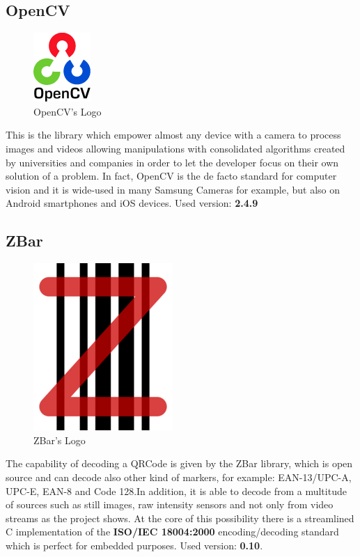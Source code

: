 \subsection{OpenCV}
\begin{figure}[hbt]
    \centering
    \caption{OpenCV's Logo}
    \includegraphics{img/opencv.png}
\end{figure}
This is the library which empower almost any device with a camera to process images and videos allowing manipulations with consolidated algorithms created by universities and companies in order to let the developer focus on their own solution of a problem. In fact, OpenCV is the de facto standard for computer vision and it is wide-used in many Samsung Cameras for example, but also on Android smartphones and iOS devices. 
\newline Used version: \textbf{2.4.9}

\subsection{ZBar}
\begin{figure}[hbt]
    \centering
    \caption{ZBar's Logo}
    \includegraphics{img/zbar.png}
\end{figure}
The capability of decoding a QRCode is given by the ZBar library, which is open source and can decode also other kind of markers, for example: EAN-13/UPC-A, UPC-E, EAN-8 and Code 128.In addition, it is able to decode from a multitude of sources such as still images, raw intensity sensors and not only from video streams as the project shows. At the core of this possibility there is a streamlined C implementation of the \textbf{ISO/IEC 18004:2000} encoding/decoding standard which is perfect for embedded purposes.
\newline Used version: \textbf{0.10}.

